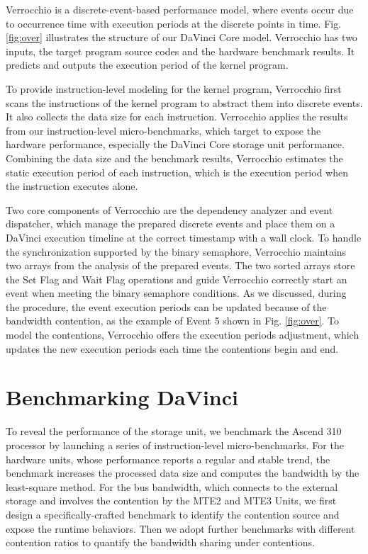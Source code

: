 Verrocchio is a discrete-event-based performance model, where events occur due to occurrence time with execution periods at the discrete points in time. Fig. \ref{fig:over} illustrates the structure of our DaVinci Core model. Verrocchio has two inputs, the target program source codes and the hardware benchmark results. It predicts and outputs the execution period of the kernel program.

To provide instruction-level modeling for the kernel program, Verrocchio first scans the instructions of the kernel program to abstract them into discrete events. It also collects the data size for each instruction. Verrocchio applies the results from our instruction-level micro-benchmarks, which target to expose the hardware performance, especially the DaVinci Core storage unit performance. Combining the data size and the benchmark results, Verrocchio estimates the static execution period of each instruction, which is the execution period when the instruction executes alone.

Two core components of Verrocchio are the dependency analyzer and event dispatcher, which manage the prepared discrete events and place them on a DaVinci execution timeline at the correct timestamp with a wall clock. To handle the synchronization supported by the binary semaphore, Verrocchio maintains two arrays from the analysis of the prepared events. The two sorted arrays store the Set Flag and Wait Flag operations and guide Verrocchio correctly start an event when meeting the binary semaphore conditions. As we discussed, during the procedure, the event execution periods can be updated because of the bandwidth contention, as the example of Event 5 shown in Fig. \ref{fig:over}. To model the contentions, Verrocchio offers the execution periods adjustment, which updates the new execution periods each time the contentions begin and end.

\section{Benchmarking DaVinci}

To reveal the performance of the storage unit, we benchmark the Ascend 310 processor by launching a series of instruction-level micro-benchmarks. For the hardware units, whose performance reports a regular and stable trend, the benchmark increases the processed data size and computes the bandwidth by the least-square method. For the bus bandwidth, which connects to the external storage and involves the contention by the MTE2 and MTE3 Units, we first design a specifically-crafted benchmark to identify the contention source and expose the runtime behaviors. Then we adopt further benchmarks with different contention ratios to quantify the bandwidth sharing under contentions.

